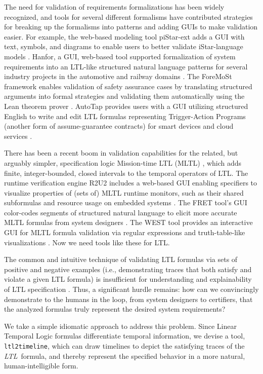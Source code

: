 \documentclass[conference]{IEEEtran}
\theoremstyle{definition}
\theoremstyle{remark}
\newcommand{\ltl}{\textit{LTL}}
\newcommand{\tool}{\texttt{ltl2timeline}}
\begin{document}
The need for validation of requirements formalizations has been widely recognized, and tools for several different formalisms have contributed strategies for breaking up the formalisms into patterns and adding GUIs to make validation easier. For example, the web-based modeling tool piStar-ext adds a GUI with text, symbols, and diagrams to enable users to better validate iStar-language models \cite{GRMPAC20}. Hanfor, a GUI, web-based tool supported formalization of system requirements into an LTL-like structured natural language patterns for several industry projects in the automotive and railway domains \cite{BDHHLPW21}.
The ForeMoSt framework enables validation of safety assurance cases by translating structured arguments into formal strategies and validating them automatically using the Lean theorem prover \cite{VMDMSC22}.
AutoTap provides users with a GUI utilizing structured English to write and edit LTL formulas representing Trigger-Action Programs (another form of assume-guarantee contracts) for smart devices and cloud services \cite{ZHMBLU19}.

There has been a recent boom in validation capabilities for the related, but arguably simpler, specification logic Mission-time LTL (MLTL) \cite{LVR19}, which adds finite, integer-bounded, closed intervals to the temporal operators of LTL. The runtime verification engine R2U2 includes a web-based GUI enabling specifiers to visualize properties of (sets of) MLTL runtime monitors, such as their shared subformulas and resource usage on embedded systems \cite{JJKRZ23}. The FRET tool's GUI color-codes segments of structured natural language to elicit more accurate MLTL formulas from system designers \cite{GPMS20}. The WEST tool provides an interactive GUI for MLTL formula validation via regular expressions and truth-table-like visualizations \cite{EGSTWR23}. Now we need tools like these for LTL.

The common and intuitive technique of validating LTL formulas via sets of positive and negative examples (i.e., demonstrating traces that both satisfy and violate a given LTL formula) is insufficient for understanding and explainability of LTL specification \cite{NR22}.
Thus, a significant hurdle remains: how can we convincingly demonstrate to the humans in the loop, from system designers to certifiers, that the analyzed formulas truly represent the desired system requirements? %

We take a simple idiomatic approach to address this problem. Since Linear Temporal Logic formulas differentiate temporal information, we devise a tool, \tool, which can draw timelines to depict the satisfying traces of the \ltl\ formula, and thereby represent the specified behavior in a more natural, human-intelligible form.
\end{document}
